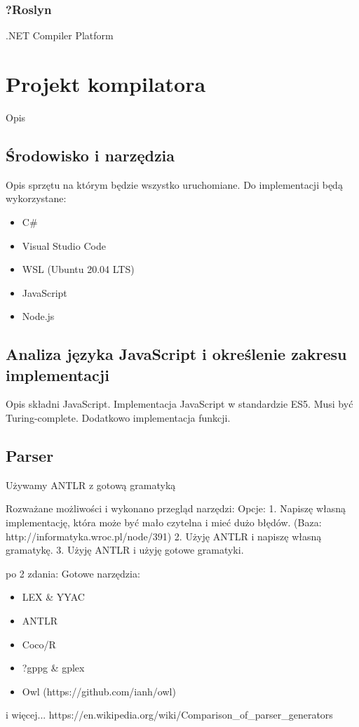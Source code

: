 \documentclass[a4paper]{article}
\begin{document}
\subsubsection{?Roslyn}
.NET Compiler Platform


\section{Projekt kompilatora}
Opis 
\subsection{Środowisko i narzędzia}
Opis sprzętu na którym będzie wszystko uruchomiane.
Do implementacji będą wykorzystane:

\begin{itemize}
  \item C\#
  \item Visual Studio Code
  \item WSL (Ubuntu 20.04 LTS)
  \item JavaScript
  \item Node.js
\end{itemize}

\subsection{Analiza języka JavaScript i określenie zakresu implementacji}
Opis składni JavaScript.
Implementacja JavaScript w standardzie ES5.
Musi być Turing-complete. Dodatkowo implementacja funkcji.

\subsection{Parser}
Używamy ANTLR z gotową gramatyką

Rozważane możliwości i wykonano przegląd narzędzi:
Opcje:
1. Napiszę własną implementację, która może być mało czytelna i mieć dużo błędów. (Baza: http://informatyka.wroc.pl/node/391)
2. Użyję ANTLR i napiszę własną gramatykę.
3. Użyję ANTLR i użyję gotowe gramatyki.

po 2 zdania: 
Gotowe narzędzia:
\begin{itemize}
  \item LEX \& YYAC
  \item ANTLR
  \item Coco/R
  \item ?gppg \& gplex
  \item Owl (https://github.com/ianh/owl)
\end{itemize}
i więcej... https://en.wikipedia.org/wiki/Comparison\_of\_parser\_generators
\end{document}
